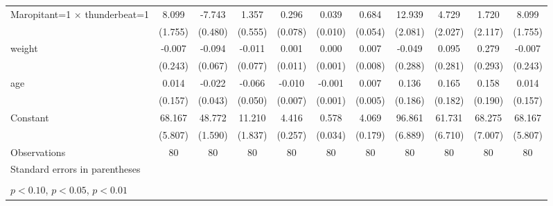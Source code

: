 \begin{table}[htbp]
\begin{tabular}{l*{10}{c}}
\addlinespace
Maropitant=1 $\times$ thunderbeat=1&       8.099\sym{***}&      -7.743\sym{***}&       1.357\sym{**} &       0.296\sym{***}&       0.039\sym{***}&       0.684\sym{***}&      12.939\sym{***}&       4.729\sym{**} &       1.720         &       8.099\sym{***}\\
                    &     (1.755)         &     (0.480)         &     (0.555)         &     (0.078)         &     (0.010)         &     (0.054)         &     (2.081)         &     (2.027)         &     (2.117)         &     (1.755)         \\
\addlinespace
weight              &      -0.007         &      -0.094         &      -0.011         &       0.001         &       0.000         &       0.007         &      -0.049         &       0.095         &       0.279         &      -0.007         \\
                    &     (0.243)         &     (0.067)         &     (0.077)         &     (0.011)         &     (0.001)         &     (0.008)         &     (0.288)         &     (0.281)         &     (0.293)         &     (0.243)         \\
\addlinespace
age                 &       0.014         &      -0.022         &      -0.066         &      -0.010         &      -0.001         &       0.007         &       0.136         &       0.165         &       0.158         &       0.014         \\
                    &     (0.157)         &     (0.043)         &     (0.050)         &     (0.007)         &     (0.001)         &     (0.005)         &     (0.186)         &     (0.182)         &     (0.190)         &     (0.157)         \\
\addlinespace
Constant            &      68.167\sym{***}&      48.772\sym{***}&      11.210\sym{***}&       4.416\sym{***}&       0.578\sym{***}&       4.069\sym{***}&      96.861\sym{***}&      61.731\sym{***}&      68.275\sym{***}&      68.167\sym{***}\\
                    &     (5.807)         &     (1.590)         &     (1.837)         &     (0.257)         &     (0.034)         &     (0.179)         &     (6.889)         &     (6.710)         &     (7.007)         &     (5.807)         \\
\midrule
Observations        &          80         &          80         &          80         &          80         &          80         &          80         &          80         &          80         &          80         &          80         \\
\bottomrule
\multicolumn{11}{l}{\footnotesize Standard errors in parentheses}\\
\multicolumn{11}{l}{\footnotesize  }\\
\multicolumn{11}{l}{\footnotesize \sym{*} \(p<0.10\), \sym{**} \(p<0.05\), \sym{***} \(p<0.01\)}\\
\end{tabular}
\end{table}
